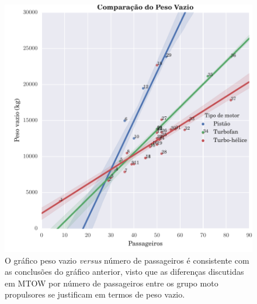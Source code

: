 \begin{figure}
\centering
\includegraphics{../autogenerated/graficos_comparativos/pesovazio.pdf}
\caption[Comparação do peso vazio]{O gráfico peso vazio \emph{versus} número de passageiros é consistente com as conclusões do gráfico anterior, visto que as diferenças discutidas em MTOW por número de passageiros entre os grupo moto propulsores se justificam em termos de peso vazio.}
\label{fig:pesovazio}
\end{figure}

